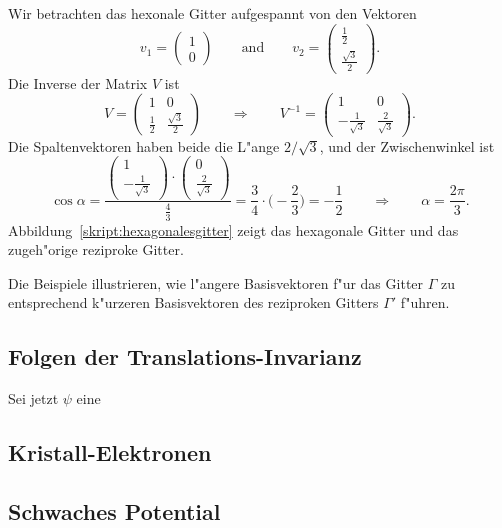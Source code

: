 \begin{beispiel}
Wir betrachten das hexonale Gitter aufgespannt von den Vektoren
\[
v_1=\begin{pmatrix}1\\0\end{pmatrix}
\qquad\text{and}\qquad
v_2=\begin{pmatrix}\frac12\\\frac{\sqrt{3}}2\end{pmatrix}.
\]
Die Inverse der Matrix $V$ ist
\[
V=\begin{pmatrix}
1&0\\
\frac12&\frac{\sqrt{3}}2
\end{pmatrix}
\qquad\Rightarrow\qquad
V^{-1}=\begin{pmatrix}
1&0\\
-\frac1{\sqrt{3}}&\frac{2}{\sqrt{3}}
\end{pmatrix}.
\]
Die Spaltenvektoren haben beide die L"ange $2/\sqrt{3}$, und der
Zwischenwinkel ist 
\[
\cos\alpha
=
\frac{
\begin{pmatrix}1\\-\frac1{\sqrt{3}}\end{pmatrix}
\cdot
\begin{pmatrix}0\\\frac{2}{\sqrt{3}}\end{pmatrix}
}{\frac{4}{3}}
=
\frac{3}{4}\cdot \biggl(-\frac{2}{3}\biggr)
=
-\frac12
\qquad \Rightarrow \qquad
\alpha=\frac{2\pi}3.
\]
Abbildung~\ref{skript:hexagonalesgitter} zeigt das hexagonale Gitter 
und das zugeh"orige reziproke Gitter.
\end{beispiel}
Die Beispiele illustrieren, wie l"angere Basisvektoren f"ur das Gitter
$\Gamma$ zu entsprechend k"urzeren Basisvektoren des reziproken
Gitters $\Gamma'$ f"uhren.

\subsection{Folgen der Translations-Invarianz}
Sei jetzt $\psi$ eine 

\subsection{Kristall-Elektronen}

\subsection{Schwaches Potential}


